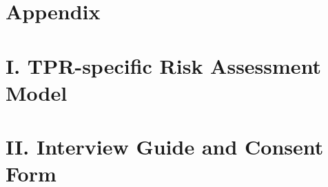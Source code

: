 
\newpage
\section*{Appendix}


\section*{I. TPR-specific Risk Assessment Model}


\section*{II. Interview Guide and Consent Form}

\newpage


